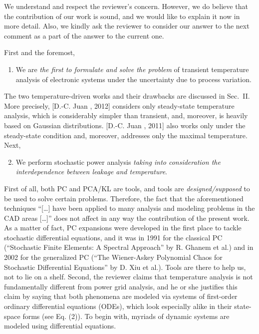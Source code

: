 \begin{authors}
We understand and respect the reviewer's concern.
However, we do believe that the contribution of our work is sound, and we would like to explain it now in more detail.
Also, we kindly ask the reviewer to consider our answer to the next comment as a part of the answer to the current one.

First and the foremost,
\begin{enumerate}
  \item We are \emph{the first to formulate and solve the problem} of transient temperature analysis of electronic systems under the uncertainty due to process variation.
\end{enumerate}
The two temperature-driven works and their drawbacks are discussed in Sec.~II.
More precisely, [D.-C. Juan \etal, 2012] considers only steady-state temperature analysis, which is considerably simpler than transient, and, moreover, is heavily based on Gaussian distributions.
[D.-C. Juan \etal, 2011] also works only under the steady-state condition and, moreover, addresses only the maximal temperature.
Next,
\begin{enumerate}
  \setcounter{enumi}{1}
  \item We perform stochastic power analysis \emph{taking into consideration the interdependence between leakage and temperature}.
\end{enumerate}
First of all, both PC and PCA/KL are tools, and tools are \emph{designed/supposed} to be used to solve certain problems.
Therefore, the fact that the aforementioned techniques ``[\ldots] have been applied to many analysis and modeling problems in the CAD areas [\ldots]'' does not affect in any way the contribution of the present work.
As a matter of fact, PC expansions were developed in the first place to tackle stochastic differential equations, and it was in 1991 for the classical PC (``Stochastic Finite Elements: A Spectral Approach'' by R. Ghanem et al.) and in 2002 for the generalized PC (``The Wiener-Askey Polynomial Chaos for Stochastic Differential Equations'' by D. Xiu et al.).
Tools are there to help us, not to lie on a shelf.
Second, the reviewer claims that temperature analysis is not fundamentally different from power grid analysis, and he or she justifies this claim by saying that both phenomena are modeled via systems of first-order ordinary differential equations (ODEs), which look especially alike in their state-space forms (see Eq. (2)).
To begin with, myriads of dynamic systems are modeled using differential equations.

\end{authors}
